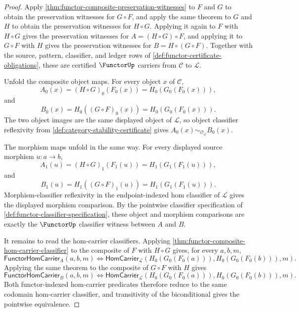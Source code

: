 \begin{proof}
Apply \autoref{thm:functor-composite-preservation-witnesses} to $F$ and $G$
to obtain the preservation witnesses for $G\circ F$, and apply the same theorem
to $G$ and $H$ to obtain the preservation witnesses for $H\circ G$. Applying
it again to $F$ with $H\circ G$ gives the preservation witnesses for
$A=(H\circ G)\circ F$, and applying it to $G\circ F$ with $H$ gives the
preservation witnesses for $B=H\circ(G\circ F)$. Together with the source,
pattern, classifier, and ledger rows of \autoref{def:functor-certificate-obligations},
these are certified $\FunctorUp$ carriers from $\mathcal C$ to $\mathcal L$.

Unfold the composite object maps. For every object $x$ of $\mathcal C$,
$$
A_0(x)=(H\circ G)_0(F_0(x))=H_0(G_0(F_0(x))),
$$
and
$$
B_0(x)=H_0((G\circ F)_0(x))=H_0(G_0(F_0(x))).
$$
The two object images are the same displayed object of $\mathcal L$, so object
classifier reflexivity from \autoref{def:category-stability-certificate} gives
$A_0(x)\sim_{\mathcal O_{\mathcal L}}B_0(x)$.

The morphism maps unfold in the same way. For every displayed source morphism
$u:a\to b$,
$$
A_1(u)=(H\circ G)_1(F_1(u))=H_1(G_1(F_1(u))),
$$
and
$$
B_1(u)=H_1((G\circ F)_1(u))=H_1(G_1(F_1(u))).
$$
Morphism-classifier reflexivity in the endpoint-indexed hom classifier of
$\mathcal L$ gives the displayed morphism comparison. By the pointwise
classifier specification of \autoref{def:functor-classifier-specification},
these object and morphism comparisons are exactly the $\FunctorUp$ classifier
witness between $A$ and $B$.

It remains to read the hom-carrier classifiers. Applying
\autoref{thm:functor-composite-hom-carrier-classifier} to the composite of
$F$ with $H\circ G$ gives, for every $a,b,m$,
$$
\mathsf{FunctorHomCarrier}_{A}(a,b,m)
\Longleftrightarrow
\mathsf{HomCarrier}_{\mathcal L}(H_0(G_0(F_0(a))),H_0(G_0(F_0(b))),m).
$$
Applying the same theorem to the composite of $G\circ F$ with $H$ gives
$$
\mathsf{FunctorHomCarrier}_{B}(a,b,m)
\Longleftrightarrow
\mathsf{HomCarrier}_{\mathcal L}(H_0(G_0(F_0(a))),H_0(G_0(F_0(b))),m).
$$
Both functor-indexed hom-carrier predicates therefore reduce to the same
codomain hom-carrier classifier, and transitivity of the biconditional gives
the pointwise equivalence.
\end{proof}

